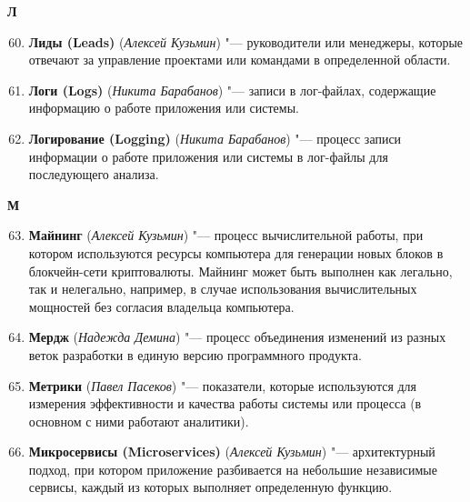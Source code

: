 \begin{flushleft} \large\textbf{Л} \end{flushleft}

\begin{enumerate}
    \setcounter{enumi}{59}

    \item \textbf{Лиды (Leads)} (\textit{Алексей Кузьмин}) "--- 
    руководители или менеджеры, которые отвечают за управление проектами или командами в определенной области. 

    \item \textbf{Логи (Logs)} (\textit{Никита Барабанов}) "--- 
    записи в лог-файлах, содержащие информацию о работе приложения или системы. 

    \item \textbf{Логирование (Logging)} (\textit{Никита Барабанов}) "--- 
    процесс записи информации о работе приложения или системы в лог-файлы для последующего анализа.
\end{enumerate}

\begin{flushleft} \large\textbf{М} \end{flushleft}

\begin{enumerate}
    \setcounter{enumi}{62}

    \item \textbf{Майнинг} (\textit{Алексей Кузьмин}) "--- 
    процесс вычислительной работы, при котором используются ресурсы компьютера для генерации новых блоков в блокчейн-сети криптовалюты. Майнинг может быть выполнен как легально, так и нелегально, например, в случае использования вычислительных мощностей без согласия владельца компьютера. 

    \item \textbf{Мердж} (\textit{Надежда Демина}) "--- 
    процесс объединения изменений из разных веток разработки в единую версию программного продукта. 

    \item \textbf{Метрики} (\textit{Павел Пасеков}) "--- 
    показатели, которые используются для измерения эффективности и качества работы системы или процесса (в основном с ними работают аналитики). 

    \item \textbf{Микросервисы (Microservices)} (\textit{Алексей Кузьмин}) "--- 
    архитектурный подход, при котором приложение разбивается на небольшие независимые сервисы, каждый из которых выполняет определенную функцию.
\end{enumerate}

